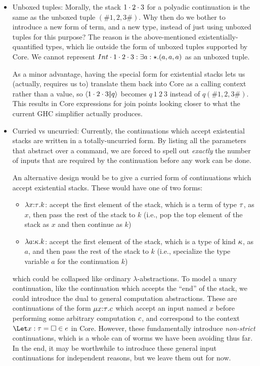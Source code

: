 \documentclass{article}
\begin{document}
\begin{itemize}
\item Unboxed tuples: Morally, the stack ${1}\cdot{{2}\cdot{3}}$ for a polyadic
  continuation is the same as the unboxed tuple $(\# 1, 2, 3 \#)$.  Why then do
  we bother to introduce a new form of term, and a new type, instead of just
  using unboxed tuples for this purpose?  The reason is the above-mentioned
  existentially-quantified types, which lie outside the form of unboxed tuples
  supported by Core.  We cannot represent
  ${Int}\cdot{{1}\cdot{{2}\cdot{3}}} : \exists{a:\star}.({a, a, a})$ as an unboxed
  tuple.

  As a minor advantage, having the special form for existential stacks lets us
  (actually, requires us to) translate them back into Core as a calling context
  rather than a value, so $\left\langle{{1}\cdot{{2}\cdot{3}}}\middle|\!\middle|{q}\right\rangle$ becomes $q ~ 1 ~ 2 ~ 3$
  instead of $q (\# 1, 2, 3 \#)$.  This results in Core expressions for join
  points looking closer to what the current GHC simplifier actually produces.

\item Curried vs uncurried: Currently, the continuations which accept
  existential stacks are written in a totally-uncurried form.  By listing all
  the parameters that abstract over a command, we are forced to spell out
  \emph{exactly} the number of inputs that are required by the continuation
  before any work can be done.

  An alternative design would be to give a curried form of continuations which
  accept existential stacks.  These would have one of two forms:
  \begin{itemize}
  \item $\lambda{x{:}{\tau}}.k$: accept the first element of the stack, which is a
    term of type $\tau$, as $x$, then pass the rest of the stack to $k$ (i.e.,
    pop the top element of the stack as $x$ and then continue as $k$)
  \item $\lambda{a{:}{\kappa}}.k$: accept the first element of the stack, which is a
    type of kind $\kappa$, as $a$, and then pass the rest of the stack to $k$
    (i.e., specialize the type variable $a$ for the continuation $k$)
  \end{itemize}
  which could be collapsed like ordinary $\lambda$-abstractions.  To model a
  unary continuation, like the continuation which accepts the ``end'' of the
  stack, we could introduce the dual to general computation abstractions.  These
  are continuations of the form $\mu{x{:}{\tau}}.c$ which accept an input
  named $x$ before performing some arbitrary computation $c$, and correspond
  to the context $\Let x:\ty = \hole \in e$ in Core.  However, these
  fundamentally introduce \emph{non-strict} continuations, which is a whole can
  of worms we have been avoiding thus far.  In the end, it may be worthwhile to
  introduce these general input continuations for independent reasons, but we
  leave them out for now.


\end{itemize}
\end{document}

